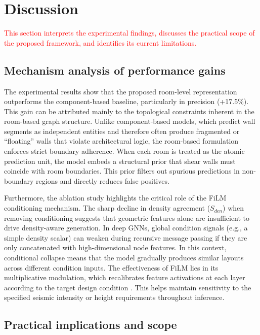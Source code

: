 \section{Discussion}
\label{sec:discussion}

\textcolor{red}{This section interprets the experimental findings, discusses the practical scope of the proposed framework, and identifies its current limitations.}

\subsection{Mechanism analysis of performance gains}
\label{subsec:mechanism}

The experimental results show that the proposed room-level representation outperforms the component-based baseline, particularly in precision (+17.5\%). This gain can be attributed mainly to the topological constraints inherent in the room-based graph structure. Unlike component-based models, which predict wall segments as independent entities and therefore often produce fragmented or ``floating'' walls that violate architectural logic, the room-based formulation enforces strict boundary adherence. When each room is treated as the atomic prediction unit, the model embeds a structural prior that shear walls must coincide with room boundaries. This prior filters out spurious predictions in non-boundary regions and directly reduces false positives.

Furthermore, the ablation study highlights the critical role of the FiLM conditioning mechanism. The sharp decline in density agreement ($S_{den}$) when removing conditioning suggests that geometric features alone are insufficient to drive density-aware generation. In deep GNNs, global condition signals (e.g., a simple density scalar) can weaken during recursive message passing if they are only concatenated with high-dimensional node features. In this context, conditional collapse means that the model gradually produces similar layouts across different condition inputs. The effectiveness of FiLM lies in its multiplicative modulation, which recalibrates feature activations at each layer according to the target design condition \cite{perezFiLMVisualReasoning2018}. This helps maintain sensitivity to the specified seismic intensity or height requirements throughout inference.

\subsection{Practical implications and scope}
\label{subsec:implications}

